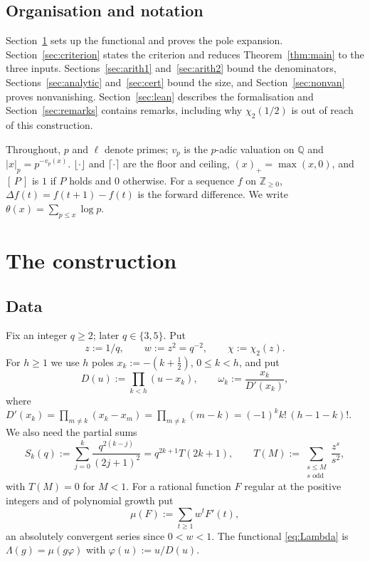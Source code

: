 \documentclass[11pt]{amsart}
\theoremstyle{definition}
\theoremstyle{remark}
\numberwithin{equation}{section}
\newcommand{\ZZ}{\mathbb{Z}}
\newcommand{\QQ}{\mathbb{Q}}
\newcommand{\ind}[1]{[\,#1\,]}
\begin{document}
\subsection{Organisation and notation}
Section~\ref{sec:construction} sets up the functional and proves the pole expansion. Section~\ref{sec:criterion}
states the criterion and reduces Theorem~\ref{thm:main} to the three inputs.
Sections~\ref{sec:arith1} and~\ref{sec:arith2} bound the denominators, Sections~\ref{sec:analytic}
and~\ref{sec:cert} bound the size, and Section~\ref{sec:nonvan} proves nonvanishing.
Section~\ref{sec:lean} describes the formalisation and Section~\ref{sec:remarks} contains remarks, including
why $\chi_2(1/2)$ is out of reach of this construction.

Throughout, $p$ and $\ell$ denote primes; $v_p$ is the $p$-adic valuation on $\QQ$ and $|x|_p=p^{-v_p(x)}$.
$\lfloor\cdot\rfloor$ and $\lceil\cdot\rceil$ are the floor and ceiling, $(x)_+=\max(x,0)$, and $\ind{P}$ is $1$ if
$P$ holds and $0$ otherwise. For a sequence $f$ on $\ZZ_{\ge0}$, $\Delta f(t)=f(t+1)-f(t)$ is the forward
difference. We write $\theta(x)=\sum_{p\le x}\log p$.

\section{The construction}\label{sec:construction}

\subsection{Data}\label{sec:data}
Fix an integer $q\ge2$; later $q\in\{3,5\}$. Put
\[
  z:=1/q,\qquad w:=z^2=q^{-2},\qquad \chi:=\chi_2(z).
\]
For $h\ge1$ we use $h$ poles $x_k:=-(k+\frac12)$, $0\le k<h$, and put
\[
  D(u):=\prod_{k<h}(u-x_k),\qquad \omega_k:=\frac{x_k}{D'(x_k)},
\]
where $D'(x_k)=\prod_{m\ne k}(x_k-x_m)=\prod_{m\ne k}(m-k)=(-1)^kk!\,(h-1-k)!$. We also need the partial sums
\[
  S_k(q):=\sum_{j=0}^{k}\frac{q^{2(k-j)}}{(2j+1)^2}=q^{2k+1}T(2k+1),\qquad T(M):=\sum_{\substack{s\le M\\ s\text{ odd}}}\frac{z^s}{s^2},
\]
with $T(M)=0$ for $M<1$. For a rational function $F$ regular at the positive integers and of polynomial growth put
\[
  \mu(F):=\sum_{t\ge1}w^tF'(t),
\]
an absolutely convergent series since $0<w<1$. The functional \eqref{eq:Lambda} is $\Lambda(g)=\mu(g\varphi)$ with
$\varphi(u):=u/D(u)$.
\end{document}
